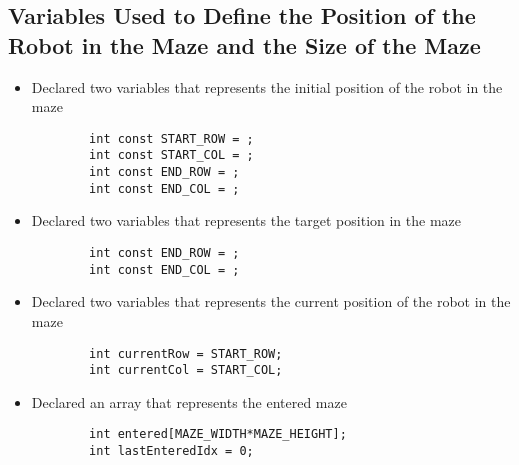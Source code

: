 \documentclass[11pt]{article}
\begin{document}
\subsection{Variables Used to Define the Position of the Robot in the Maze and the Size of the Maze}
\begin{itemize}
\item Declared two variables that represents the initial position of the robot in the maze
	\begin{verbatim}
		int const START_ROW = ;
		int const START_COL = ;
		int const END_ROW = ; 
		int const END_COL = ;
	\end{verbatim} 
\item Declared two variables that represents the target position in the maze
	\begin{verbatim}
		int const END_ROW = ; 
		int const END_COL = ;
	\end{verbatim}
\item Declared two variables that represents the current position of the robot in the maze 
	\begin{verbatim}
		int currentRow = START_ROW;
		int currentCol = START_COL;
	\end{verbatim} 
\item Declared an array that represents the entered maze 
	\begin{verbatim}
		int entered[MAZE_WIDTH*MAZE_HEIGHT];
		int lastEnteredIdx = 0;
	\end{verbatim} 
\end{itemize}
\newpage
\end{document}
